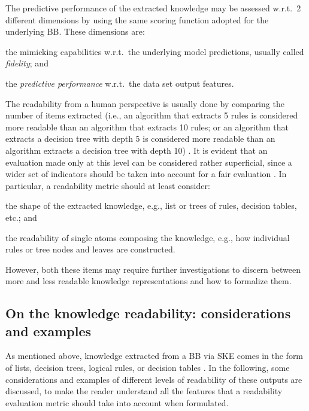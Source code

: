 \documentclass{article}
\newenvironment{inlinelist}{\begin{enumerate*}[label=\emph{(\roman{*})}]}{\end{enumerate*}}
\begin{document}
The predictive performance of the extracted knowledge may be assessed w.r.t.\ 2 different dimensions by using the same scoring function adopted for the underlying BB.
%
These dimensions are:
%
\begin{inlinelist}
	\item the mimicking capabilities w.r.t.\ the underlying model predictions, usually called \emph{fidelity}; and
	\item the \emph{predictive performance} w.r.t.\ the data set output features.
\end{inlinelist}

The readability from a human perspective is usually done by comparing the number of items extracted (i.e., an algorithm that extracts 5 rules is considered more readable than an algorithm that extracts 10 rules; or an algorithm that extracts a decision tree with depth 5 is considered more readable than an algorithm extracts a decision tree with depth 10) \cite{literature}.
% 
It is evident that an evaluation made only at this level can be considered rather superficial, since a wider set of indicators should be taken into account for a fair evaluation \cite{sabbatini2022-metrics}.
%
In particular, a readability metric should at least consider:
%
\begin{inlinelist}
	\item the shape of the extracted knowledge, e.g., list or trees of rules, decision tables, etc.; and
	\item the readability of single atoms composing the knowledge, e.g., how individual rules or tree nodes and leaves are constructed.
\end{inlinelist}
%
However, both these items may require further investigations to discern between more and less readable knowledge representations and how to formalize them.

\subsection{On the knowledge readability: considerations and examples}\label{sec:motivation}
As mentioned above, knowledge extracted from a BB via SKE comes in the form of lists, decision trees, logical rules, or decision tables \cite{aggiungere}. 
%
In the following, some considerations and examples of different levels of readability of these outputs are discussed, to make the reader understand all the features that a readability evaluation metric should take into account when formulated.
\end{document}

